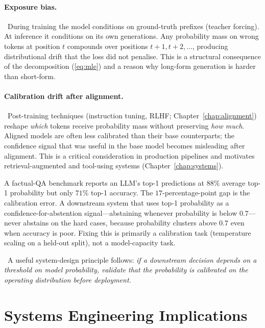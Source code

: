 \paragraph{Exposure bias.}
\Cons\ During training the model conditions on ground-truth prefixes
(teacher forcing). At inference it conditions on its own generations.
Any probability mass on wrong tokens at position $t$ compounds over
positions $t+1, t+2, \ldots$, producing distributional drift that the
loss did not penalise. This is a structural consequence of the
decomposition (\ref{eq:mle}) and a reason why long-form generation is
harder than short-form.

\paragraph{Calibration drift after alignment.}
\Emp\ Post-training techniques (instruction tuning, RLHF; Chapter~\ref{chap:alignment})
reshape \emph{which} tokens receive probability mass without preserving
\emph{how much}. Aligned models are often less calibrated than their
base counterparts; the confidence signal that was useful in the base
model becomes misleading after alignment. This is a critical
consideration in production pipelines and motivates retrieval-augmented
and tool-using systems (Chapter~\ref{chap:systems}).

\begin{workedexample}
A factual-QA benchmark reports an LLM's top-1 predictions at $88\%$
average top-1 probability but only $71\%$ top-1 accuracy. The
$17$-percentage-point gap is the calibration error. A downstream
system that uses top-1 probability as a confidence-for-abstention
signal---abstaining whenever probability is below $0.7$---never
abstains on the hard cases, because probability clusters above $0.7$
even when accuracy is poor. Fixing this is primarily a calibration
task (temperature scaling on a held-out split), not a model-capacity
task.
\end{workedexample}

\Cons\ A useful system-design principle follows: \emph{if a downstream
decision depends on a threshold on model probability, validate that the
probability is calibrated on the operating distribution before
deployment.}

\section{Systems Engineering Implications}

